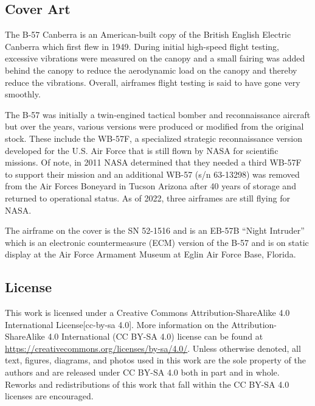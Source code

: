 \documentclass[12pt,letter]{article}
\begin{document}







\subsection{Cover Art}
The B-57 Canberra is an American-built copy of the British English Electric Canberra which first flew in 1949. During initial high-speed flight testing, excessive vibrations were measured on the canopy and a small fairing was added behind the canopy to reduce the aerodynamic load on the canopy and thereby reduce the vibrations. Overall, airframes flight testing is said to have gone very smoothly. 

The B-57 was initially a twin-engined tactical bomber and reconnaissance aircraft but over the years, various versions were produced or modified from the original stock. These include the WB-57F, a specialized strategic reconnaissance version developed for the U.S. Air Force that is still flown by NASA for scientific missions. Of note, in 2011 NASA determined that they needed a third WB-57F to support their mission and an additional WB-57 (s/n 63-13298) was removed from the Air Forces Boneyard in Tucson Arizona after 40 years of storage and returned to operational status. As of 2022, three airframes are still flying for NASA.

The airframe on the cover is the SN 52-1516 and is an EB-57B ``Night Intruder'' which is an electronic countermeasure (ECM) version of the B-57 and is on static display at the Air Force Armament Museum at Eglin Air Force Base, Florida. 

\pagebreak

\subsection{License}
This work is licensed under a Creative Commons Attribution-ShareAlike 4.0 International License[cc-by-sa 4.0]. More information on the Attribution-ShareAlike 4.0 International (CC BY-SA 4.0) license can be found at  \url{https://creativecommons.org/licenses/by-sa/4.0/}. Unless otherwise denoted, all text, figures, diagrams, and photos used in this work are the sole property of the authors and are released under CC BY-SA 4.0 both in part and in whole. Reworks and redistributions of this work that fall within the CC BY-SA 4.0 licenses are encouraged.
\end{document}
